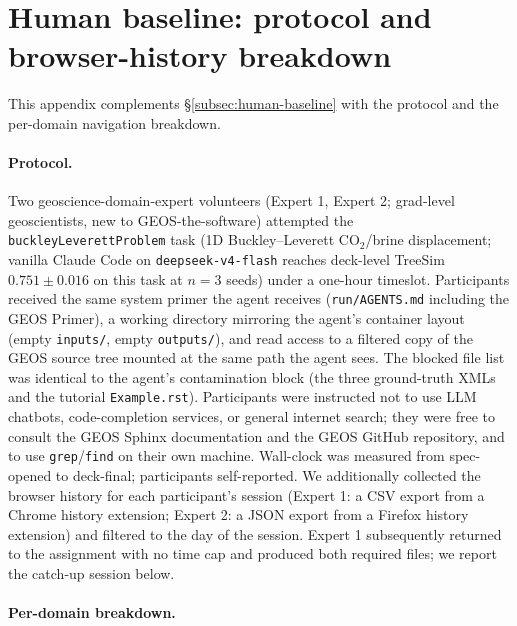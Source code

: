 \documentclass{article}
\begin{document}
\section{Human baseline: protocol and browser-history breakdown}
\label{app:human-browser}

This appendix complements \S\ref{subsec:human-baseline} with the protocol and the per-domain navigation breakdown.

\paragraph{Protocol.} Two geoscience-domain-expert volunteers (Expert 1, Expert 2; grad-level geoscientists, new to GEOS-the-software) attempted the \texttt{buckleyLeverettProblem} task (1D Buckley--Leverett CO$_2$/brine displacement; vanilla Claude Code on \texttt{deepseek-v4-flash} reaches deck-level TreeSim $0.751 \pm 0.016$ on this task at $n=3$ seeds) under a one-hour timeslot. Participants received the same system primer the agent receives (\texttt{run/AGENTS.md} including the GEOS Primer), a working directory mirroring the agent's container layout (empty \texttt{inputs/}, empty \texttt{outputs/}), and read access to a filtered copy of the GEOS source tree mounted at the same path the agent sees. The blocked file list was identical to the agent's contamination block (the three ground-truth XMLs and the tutorial \texttt{Example.rst}). Participants were instructed not to use LLM chatbots, code-completion services, or general internet search; they were free to consult the GEOS Sphinx documentation and the GEOS GitHub repository, and to use \texttt{grep}/\texttt{find} on their own machine. Wall-clock was measured from spec-opened to deck-final; participants self-reported. We additionally collected the browser history for each participant's session (Expert 1: a CSV export from a Chrome history extension; Expert 2: a JSON export from a Firefox history extension) and filtered to the day of the session. Expert 1 subsequently returned to the assignment with no time cap and produced both required files; we report the catch-up session below.

\paragraph{Per-domain breakdown.}
\end{document}
